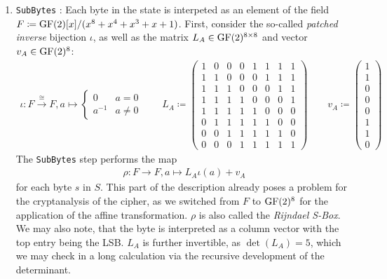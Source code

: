 \begin{enumerate}[label=(\roman*)]
    \item \label{aes_subbytes} \texttt{SubBytes} \cite[pp. 34-37]{Daemen_2020}: Each byte in the state is interpeted as an element of the field \(F \coloneqq \operatorname{GF}(2)[x]/(x^8+x^4+x^3+x+1)\). First, consider the so-called \emph{patched inverse} bijection \(\iota\), as well as the matrix \(L_A \in \operatorname{GF}(2)^{8 \times 8}\) and vector \(v_A \in \operatorname{GF}(2)^8\):
    \begin{align}
        \iota\colon F \overset{\cong}{\to} F, a \mapsto \begin{cases}
            0 & a = 0\\
            a^{-1} & a \neq 0
        \end{cases} \qquad L_A \coloneqq \begin{pmatrix}
            1&0&0&0&1&1&1&1\\
            1&1&0&0&0&1&1&1\\
            1&1&1&0&0&0&1&1\\
            1&1&1&1&0&0&0&1\\
            1&1&1&1&1&0&0&0\\
            0&1&1&1&1&1&0&0\\
            0&0&1&1&1&1&1&0\\
            0&0&0&1&1&1&1&1
        \end{pmatrix} \qquad v_A \coloneqq \begin{pmatrix}
            1\\
            1\\
            0\\
            0\\
            0\\
            1\\
            1\\
            0
        \end{pmatrix}
    \end{align}
    The \texttt{SubBytes} step performs the map
    \begin{align}
        \rho\colon F \to F, a \mapsto L_A \iota(a) + v_A
    \end{align}
    for each byte \(s\) in \(S\). This part of the description already poses a problem for the cryptanalysis of the cipher, as we switched from \(F\) to \(\operatorname{GF}(2)^8\) for the application of the affine transformation. \(\rho\) is also called the \emph{Rijndael S-Box}. We may also note, that the byte is interpreted as a column vector with the top entry being the LSB. \(L_A\) is further invertible, as \(\det(L_A) = 5\), which we may check in a long calculation via the recursive development of the determinant.

\end{enumerate}
